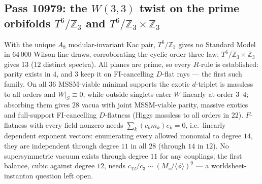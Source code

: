 \subsection{Pass 10979: the $W(3,3)$ twist on the prime orbifolds $T^6/\mathbb{Z}_3$ and $T^6/\mathbb{Z}_3\times\mathbb{Z}_3$}

With the unique $A_8$ modular-invariant Kac pair, $T^6/\mathbb{Z}_3$ gives no Standard Model in $64\,000$ Wilson-line draws,
corroborating the cyclic order-three law; $T^6/\mathbb{Z}_3\times\mathbb{Z}_3$ gives $13$ ($12$ distinct spectra).  All planes are
prime, so every $R$-rule is established: parity exists in $4$, and $3$ keep it on FI-cancelling $D$-flat rays --- the first
such family.  On all $36$ MSSM-viable minimal supports the exotic $d$-triplet is massless to all orders and
$W|_S\equiv0$, while outside singlets enter $W$ linearly at order $3$--$4$; absorbing them gives $28$ vacua with joint
MSSM-viable parity, massive exotics and full-support FI-cancelling $D$-flatness (Higgs massless to all orders in $22$).
$F$-flatness with every field nonzero needs $\sum_k(c_km_k)e_k=0$, i.e.\ linearly dependent exponent vectors: enumerating
every allowed monomial to degree $14$, they are independent through degree $11$ in all $28$ (through $14$ in $12$).  No
supersymmetric vacuum exists through degree $11$ for any couplings; the first balance, cubic against degree $12$, needs
$c_{12}/c_3\sim(M_s/\langle\phi\rangle)^9$ --- a worldsheet-instanton question left open.
